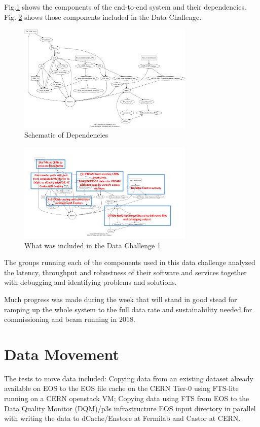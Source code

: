 \documentclass[pdftex,12pt,letter]{article}
\begin{document}
 Fig.\ref{fig:dependencies} shows the components of the end-to-end system and their dependencies. Fig. \ref{fig:intermediate} shows those components included in the Data Challenge. 


\begin{figure}[tbh]
  \centering
  \includegraphics[width=0.75\textwidth]{../figures/dc1_integration.png}
  \caption{Schematic of Dependencies}
  \label{fig:dependencies}
\end{figure}


\begin{figure}[tbh]
  \centering
  \includegraphics[width=0.75\textwidth]{./ReportImages/intermediate.pdf}
  \caption{What was included in the Data Challenge 1}
  \label{fig:intermediate}
\end{figure}

The groups running each of the components  used in this data challenge analyzed  the latency, throughput and robustness of their software and services together with debugging and identifying problems and solutions. 

Much progress was made during the week that  will stand in good stead for ramping up the whole system to the full data rate and sustainability needed for commissioning and beam running in 2018. 



\section {Data Movement}
The tests to move data included:  Copying data from an existing dataset already available on EOS to the EOS file cache on the CERN Tier-0 using  FTS-lite running on a CERN openstack VM; Copying data using FTS from EOS to the Data Quality Monitor (DQM)/p3s infrastructure EOS input directory in parallel with writing the data to dCache/Enstore at Fermilab and Castor at CERN. 
\end{document}
